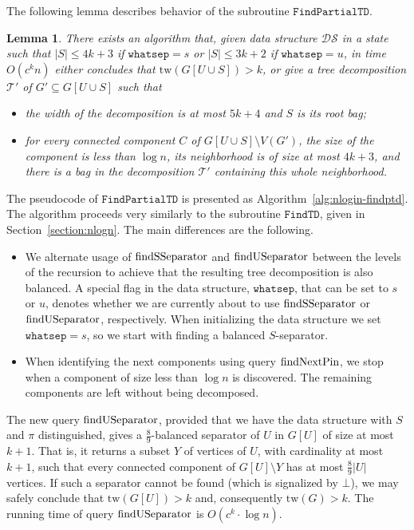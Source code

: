 \documentclass[a4paper,11pt]{article}
\newtheorem{lemma}{Lemma}[section]
\theoremstyle{definition}
\theoremstyle{remark}
\newcommand{\findTD}{\mathtt{FindTD}}
\newcommand{\findPTD}{\mathtt{FindPartialTD}}
\newcommand{\whatsep}{\mathtt{whatsep}}
\newcommand{\ds}{\mathcal{DS}}
\newcommand{\qUsep}{\textnormal{findUSeparator}}
\newcommand{\qSsep}{\textnormal{findSSeparator}}
\newcommand{\qpin}{\textnormal{findNextPin}}
\newcommand{\pin}{\pi}
\newcommand{\td}{\mathcal{T}} \newcommand{\tw}{\mathrm{tw}} \newcommand{\w}{\mathrm{w}}
\begin{document}
The following lemma describes behavior of the subroutine $\findPTD$.

\begin{lemma}
  \label{lemma:findPTD}
  There exists an algorithm that, given data structure $\ds$ in a
  state such that $|S| \leq 4k+3$ if $\whatsep = s$ or $|S| \leq 3k+2$
  if $\whatsep = u$, in time $O(c^k n)$ either concludes that $\tw(G[U
  \cup S]) > k$, or give a tree decomposition $\td'$ of $G' \subseteq
  G[U \cup S]$ such that
  \begin{itemize}
  \item the width of the decomposition is at most $5k+4$ and $S$ is
    its root bag;
  \item for every connected component $C$ of $G[U \cup S]\setminus V(G')$, the
    size of the component is less than $\log n$, its neighborhood is
    of size at most $4k+3$, and there is a bag in the decomposition
    $\td'$ containing this whole neighborhood.
  \end{itemize}
\end{lemma}

The pseudocode of $\findPTD$ is presented as
Algorithm~\ref{alg:nlogin-findptd}.  The algorithm proceeds very
similarly to the subroutine $\findTD$, given in
Section~\ref{section:nlogn}.  The main differences are the following.
\begin{itemize}
\item We alternate usage of $\qSsep$ and $\qUsep$ between the levels
  of the recursion to achieve that the resulting tree decomposition is
  also balanced.  A special flag in the data structure, $\whatsep$,
  that can be set to $s$ or $u$, denotes whether we are currently
  about to use $\qSsep$ or $\qUsep$, respectively.  When initializing
  the data structure we set $\whatsep=s$, so we start with finding a
  balanced $S$-separator.
\item When identifying the next components using query $\qpin$, we
  stop when a component of size less than $\log n$ is discovered.  The
  remaining components are left without being decomposed.
\end{itemize}
The new query $\qUsep$, provided that we have the data structure with
$S$ and $\pin$ distinguished, gives a $\frac{8}{9}$-balanced separator
of $U$ in $G[U]$ of size at most $k+1$.  That is, it returns a subset
$Y$ of vertices of $U$, with cardinality at most $k+1$, such that
every connected component of $G[U]\setminus Y$ has at most
$\frac{8}{9}|U|$ vertices.  If such a separator cannot be found (which
is signalized by $\bot$), we may safely conclude that $\tw(G[U])>k$
and, consequently $\tw(G)>k$.  The running time of query $\qUsep$ is
$O(c^k\cdot \log n)$.
\end{document}

